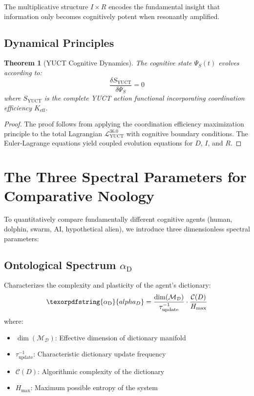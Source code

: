 \documentclass[12pt,a4paper]{article}
\newtheorem{theorem}{Theorem}
\DeclareRobustCommand{\alD}{\texorpdfstring{\ensuremath{\alpha_{\mathrm{D}}}}{alpha_D}}
\newcommand{\Dict}{\mathcal{D}}
\newcommand{\Mdict}{\mathcal{M}_{\Dict}}
\newcommand{\Ke}{K_{\mathrm{eff}}}
\begin{document}
	The multiplicative structure \(I \times R\) encodes the fundamental insight that information only becomes cognitively potent when resonantly amplified.
	
	\subsection{Dynamical Principles}
	
	\begin{theorem}[YUCT Cognitive Dynamics]
		The cognitive state \(\Psi_S(t)\) evolves according to:
		\begin{equation}
			\label{eq:cognitive-dynamics}
			\frac{\delta S_{\mathrm{YUCT}}}{\delta \Psi_S} = 0
		\end{equation}
		where \(S_{\mathrm{YUCT}}\) is the complete YUCT action functional incorporating coordination efficiency \(\Ke\).
	\end{theorem}
	
	\begin{proof}
		The proof follows from applying the coordination efficiency maximization principle to the total Lagrangian \(\mathcal{L}_{\mathrm{YUCT}}^{36.0}\) with cognitive boundary conditions. The Euler-Lagrange equations yield coupled evolution equations for \(D\), \(I\), and \(R\).
	\end{proof}
	
	\section{The Three Spectral Parameters for Comparative Noology}
	
	To quantitatively compare fundamentally different cognitive agents (human, dolphin, swarm, AI, hypothetical alien), we introduce three dimensionless spectral parameters:
	
	\subsection{Ontological Spectrum \alD}
	
	Characterizes the complexity and plasticity of the agent's dictionary:
	\begin{equation}
		\label{eq:alphaD}
		\alD = \frac{\dim(\Mdict)}{\tau_{\mathrm{update}}^{-1}} \cdot \frac{\mathcal{C}(D)}{H_{\mathrm{max}}}
	\end{equation}
	where:
	\begin{itemize}
		\item \(\dim(\Mdict)\): Effective dimension of dictionary manifold
		\item \(\tau_{\mathrm{update}}^{-1}\): Characteristic dictionary update frequency
		\item \(\mathcal{C}(D)\): Algorithmic complexity of the dictionary
		\item \(H_{\mathrm{max}}\): Maximum possible entropy of the system
	\end{itemize}
	
\end{document}
